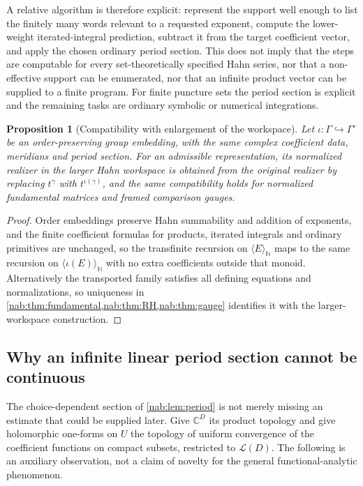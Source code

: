 \documentclass[11pt,letterpaper]{article}
\newtheorem{proposition}[proposition]{Proposition}
\theoremstyle{definition}
\theoremstyle{remark}
\newcommand{\C}{\mathbb C}
\newcommand{\N}{\mathbb N}
\newcommand{\LL}{\mathcal L}
\newcommand{\angles}[1]{\langle #1\rangle_{\N}}
\numberwithin{equation}{section}
\begin{document}
A relative algorithm is therefore explicit: represent the support well enough
to list the finitely many words relevant to a requested exponent, compute the
lower-weight iterated-integral prediction, subtract it from the target
coefficient vector, and apply the chosen ordinary period section. This does not
imply that the steps are computable for every set-theoretically specified Hahn
series, nor that a non-effective support can be enumerated, nor that an
infinite product vector can be supplied to a finite program. For finite
puncture sets the period section is explicit and the remaining tasks are
ordinary symbolic or numerical integrations.

\begin{proposition}[Compatibility with enlargement of the workspace]
\label{nab:prop:basechange}
Let $\iota:\Gamma\hookrightarrow\Gamma'$ be an order-preserving group
embedding, with the same complex coefficient data, meridians and period
section. For an admissible representation, its normalized realizer in the
larger Hahn workspace is obtained from the original realizer by replacing
$t^\gamma$ with $t^{\iota(\gamma)}$, and the same compatibility holds for
normalized fundamental matrices and framed comparison gauges.
\end{proposition}

\begin{proof}
Order embeddings preserve Hahn summability and addition of exponents, and the
finite coefficient formulas for products, iterated integrals and ordinary
primitives are unchanged, so the transfinite recursion on $\angles E$ maps to
the same recursion on $\angles{\iota(E)}$ with no extra coefficients outside
that monoid. Alternatively the transported family satisfies all defining
equations and normalizations, so uniqueness in
\cref{nab:thm:fundamental,nab:thm:RH,nab:thm:gauge} identifies it with the
larger-workspace construction.
\end{proof}

\subsection{Why an infinite linear period section cannot be continuous}

The choice-dependent section of \cref{nab:lem:period} is not merely missing an
estimate that could be supplied later. Give $\C^D$ its product topology and
give holomorphic one-forms on $U$ the topology of uniform convergence of the
coefficient functions on compact subsets, restricted to $\LL(D)$. The
following is an auxiliary observation, not a claim of novelty for the general
functional-analytic phenomenon.
\end{document}
